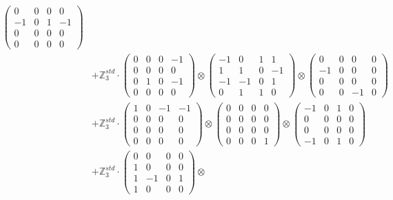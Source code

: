 \documentclass{article}
\begin{document}
{\begin{align}
            \begin{pmatrix} 0 & 0 & 0 & 0 \\ -1 & 0 & 1 & -1 \\ 0 & 0 & 0 & 0 \\ 0 & 0 & 0 & 0 \end{pmatrix} \\ 
        &+ \label{Rs12-Rc12-Solution-1-c15} \mathbb{Z}_3^{std} \cdot 
            \begin{pmatrix} 0 & 0 & 0 & -1 \\ 0 & 0 & 0 & 0 \\ 0 & 1 & 0 & -1 \\ 0 & 0 & 0 & 0 \end{pmatrix} \otimes 
            \begin{pmatrix} -1 & 0 & 1 & 1 \\ 1 & 1 & 0 & -1 \\ -1 & -1 & 0 & 1 \\ 0 & 1 & 1 & 0 \end{pmatrix} \otimes 
            \begin{pmatrix} 0 & 0 & 0 & 0 \\ -1 & 0 & 0 & 0 \\ 0 & 0 & 0 & 0 \\ 0 & 0 & -1 & 0 \end{pmatrix} \\ 
        &+ \label{Rs12-Rc12-Solution-1-c16} \mathbb{Z}_3^{std} \cdot 
            \begin{pmatrix} 1 & 0 & -1 & -1 \\ 0 & 0 & 0 & 0 \\ 0 & 0 & 0 & 0 \\ 0 & 0 & 0 & 0 \end{pmatrix} \otimes 
            \begin{pmatrix} 0 & 0 & 0 & 0 \\ 0 & 0 & 0 & 0 \\ 0 & 0 & 0 & 0 \\ 0 & 0 & 0 & 1 \end{pmatrix} \otimes 
            \begin{pmatrix} -1 & 0 & 1 & 0 \\ 0 & 0 & 0 & 0 \\ 0 & 0 & 0 & 0 \\ -1 & 0 & 1 & 0 \end{pmatrix} \\ 
        &+ \label{Rs12-Rc12-Solution-1-c17} \mathbb{Z}_3^{std} \cdot 
            \begin{pmatrix} 0 & 0 & 0 & 0 \\ 1 & 0 & 0 & 0 \\ 1 & -1 & 0 & 1 \\ 1 & 0 & 0 & 0 \end{pmatrix} \otimes 

\end{align}}
\end{document}
